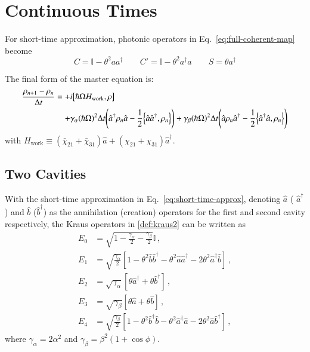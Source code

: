\documentclass[entropy,article,submit,pdftex,moreauthors]{Definitions/mdpi}
\renewcommand{\a}{\hat{a}}
\newcommand{\ad}{\hat{a}^\dagger}
\renewcommand{\b}{\hat{b}}
\newcommand{\bd}{\hat{b}^\dagger}
\renewcommand{\tt}{\theta^2}
\newcommand{\ga}{\gamma_\alpha}
\newcommand{\gb}{\gamma_\beta}
\renewcommand{\r}{\rho}
\begin{document}
\section{Continuous Times}
For short-time approximation, photonic operators in Eq.~\cref{eq:full-coherent-map} become
\begin{equation}\label{eq:short-time-approx}
    C=\mathbb{I} - \theta^2aa^\dagger \qquad
    C'= \mathbb{I} - \theta^2a^\dagger a \qquad
    S = \theta a^\dagger 
\end{equation}

%
The final form of the master equation is:
\begin{equation}
\begin{split}
    \frac{\rho_{n+1} - \rho_n}{\Delta t} =
    +&i\comm{\hbar\Omega H_{\text{work}}}{\r} \\
    +&\ga(\hbar\Omega)^2\Delta t\left(\ad\rho_n\a -\frac{1}{2}\acomm{\a\ad}{\rho_n} \right)
    +\gb(\hbar\Omega)^2\Delta t\left(\a\rho_n\ad -\frac{1}{2}\acomm{\ad\a}{\rho_n} \right) 
\end{split}
\end{equation}
with $H_{\text{work}}\equiv(\bar{\chi}_{21}+\bar{\chi}_{31})\a + (\chi_{21}+\chi_{31})\ad$.

\subsection{Two Cavities}
\renewcommand{\b}{\hat{b}}
With the short-time approximation in Eq.~\ref{eq:short-time-approx}, denoting $\a$ ( $\ad$ ) and $\hat{b}$ ($\bd$) as the annihilation (creation) operators for the first  and second cavity respectively, the Kraus operators in \ref{def:kraus2} can be written as
\begin{align}
    E_0 &= \sqrt{1-\frac{\gamma_\alpha}{2}-\frac{\gamma_\beta}{2}}\mathbb{I}\, , 
    \\[1em]
    E_1 &= \sqrt{\frac{\gamma_\alpha}{2}}\left[ 1-\tt\b\bd-\tt\a\ad-2\tt\ad\b \right]\, ,
    \\[1em]
    E_2 &= \sqrt{\gamma_\alpha}\left[ \theta\ad + \theta\bd \right]\, ,
    \\[1em]
    E_3 &= \sqrt{\gamma_\beta}\left[ \theta\a + \theta\b \right]\, ,
    \\[1em]
    E_4 &= \sqrt{\frac{\gamma_\beta}{2}}\left[ 1-\tt\bd\b-\tt\ad\a-2\tt\a\bd \right]\, ,
\end{align}
where $\ga=2\alpha^2$ and $\gb=\beta^2(1+\cos\phi)$.
\end{document}
